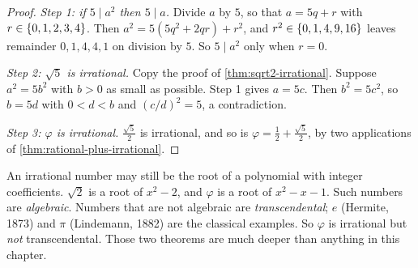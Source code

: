 \begin{proof}
  \emph{Step 1: if $5 \mid a^2$ then $5 \mid a$.} Divide $a$ by $5$, so that
  $a = 5q + r$ with $r \in \{0, 1, 2, 3, 4\}$. Then
  $a^2 = 5(5q^2 + 2qr) + r^2$, and $r^2 \in \{0, 1, 4, 9, 16\}$ leaves
  remainder $0, 1, 4, 4, 1$ on division by $5$. So $5 \mid a^2$ only when
  $r = 0$.

  \emph{Step 2: $\sqrt5$ is irrational.} Copy the proof of
  \cref{thm:sqrt2-irrational}. Suppose $a^2 = 5b^2$ with $b > 0$ as small as
  possible. Step 1 gives $a = 5c$. Then $b^2 = 5c^2$, so $b = 5d$ with
  $0 < d < b$ and $(c/d)^2 = 5$, a contradiction.

  \emph{Step 3: $\varphi$ is irrational.} $\frac{\sqrt5}{2}$ is irrational,
  and so is $\varphi = \frac12 + \frac{\sqrt5}{2}$, by two applications of
  \cref{thm:rational-plus-irrational}.
\end{proof}

\begin{remark}
  An irrational number may still be the root of a polynomial with integer
  coefficients. $\sqrt2$ is a root of $x^2 - 2$, and $\varphi$ is a root of
  $x^2 - x - 1$. Such numbers are \emph{algebraic}. Numbers that are not
  algebraic are \emph{transcendental}; $e$ (Hermite, 1873) and $\pi$
  (Lindemann, 1882) are the classical examples. So $\varphi$ is irrational
  but \emph{not} transcendental. Those two theorems are much deeper than
  anything in this chapter.
\end{remark}
